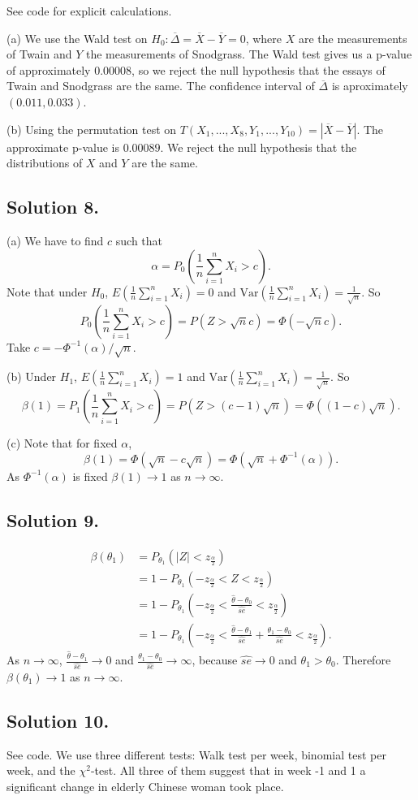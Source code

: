 See code for explicit calculations.

(a) We use the Wald test on $H_0: \overline{\Delta} = \overline{X} - \overline{Y} = 0$, where $X$ are the measurements of Twain and $Y$ the measurements of Snodgrass.
The Wald test gives us a p-value of approximately $0.00008$, so we reject the null hypothesis that the essays of Twain and Snodgrass are the same.
The confidence interval of $\overline{\Delta}$ is aproximately $(0.011, 0.033)$.

(b) Using the permutation test on $T(X_1, ..., X_8, Y_1, ..., Y_{10}) = |\overline{X} - \overline{Y}|$.
The approximate p-value is $0.00089$.
We reject the null hypothesis that the distributions of $X$ and $Y$ are the same.


\subsection*{Solution 8.}

(a) We have to find $c$ such that
$$
\alpha = P_0\left(\frac{1}{n}\sum_{i = 1}^n X_i > c\right).
$$
Note that under $H_0$, $E(\frac{1}{n}\sum_{i = 1}^n X_i) = 0$ and $\mathrm{Var}(\frac{1}{n}\sum_{i = 1}^n X_i) = \frac{1}{\sqrt{n}}$.
So
$$
P_0\left(\frac{1}{n} \sum_{i = 1}^n X_i > c\right) = P(Z > \sqrt{n}c) = \Phi(-\sqrt{n}c).
$$
Take $c = -\Phi^{-1}(\alpha)/\sqrt{n}$.

(b) Under $H_1$, $E(\frac{1}{n} \sum_{i = 1}^n X_i) = 1$ and $\mathrm{Var}(\frac{1}{n} \sum_{i = 1}^n X_i) = \frac{1}{\sqrt{n}}$.
So
$$
\beta(1) = P_1\left(\frac{1}{n} \sum_{i = 1}^n X_i > c\right) = P(Z > (c - 1)\sqrt{n}) = \Phi((1 - c)\sqrt{n}).
$$

(c) Note that for fixed $\alpha$,
$$
\beta(1) = \Phi(\sqrt{n} - c\sqrt{n}) = \Phi(\sqrt{n} + \Phi^{-1}(\alpha)).
$$
As $\Phi^{-1}(\alpha)$ is fixed $\beta(1) \to 1$ as $n \to \infty$.


\subsection*{Solution 9.}
\begin{equation*}
\begin{split}
\beta(\theta_1) &= P_{\theta_1}(|Z| < z_{\frac{\alpha}{2}}) \\
    &= 1 - P_{\theta_1}(-z_{\frac{\alpha}{2}} < Z < z_{\frac{\alpha}{2}}) \\
    &= 1 - P_{\theta_1}\left(-z_{\frac{\alpha}{2}} < \frac{\hat{\theta} - \theta_0}{\hat{se}} < z_{\frac{\alpha}{2}}\right) \\
    &= 1 - P_{\theta_1}\left(-z_{\frac{\alpha}{2}} < \frac{\hat{\theta} - \theta_1}{\hat{se}} + \frac{\theta_1 - \theta_0}{\hat{se}} < z_{\frac{\alpha}{2}}\right).
\end{split}
\end{equation*}
As $n \to \infty$, $\frac{\hat{\theta} - \theta_1}{\hat{se}} \to 0$ and $\frac{\theta_1 - \theta_0}{\hat{se}} \to \infty$, because $\hat{se} \to 0$ and $\theta_1 > \theta_0$.
Therefore $\beta(\theta_1) \to 1$ as $n \to \infty$.


\subsection*{Solution 10.}

See code.
We use three different tests: Walk test per week, binomial test per week, and the $\chi^2$-test.
All three of them suggest that in week -1 and 1 a significant change in elderly Chinese woman took place.
